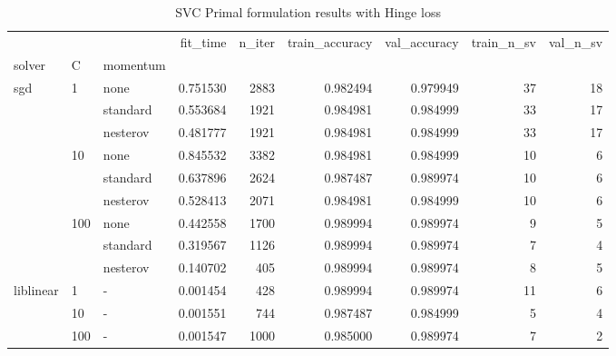 \begin{table}[H]
\centering
\caption{SVC Primal formulation results with Hinge loss}
\label{primal_svc_hinge_cv_results}
\begin{tabular}{lllrrrrrr}
\toprule
          &     &   &  fit\_time &  n\_iter &  train\_accuracy &  val\_accuracy &  train\_n\_sv &  val\_n\_sv \\
solver & C & momentum &           &         &                 &               &             &           \\
\midrule
sgd & 1   & none &  0.751530 &    2883 &        0.982494 &      0.979949 &          37 &        18 \\
          &     & standard &  0.553684 &    1921 &        0.984981 &      0.984999 &          33 &        17 \\
          &     & nesterov &  0.481777 &    1921 &        0.984981 &      0.984999 &          33 &        17 \\
          & 10  & none &  0.845532 &    3382 &        0.984981 &      0.984999 &          10 &         6 \\
          &     & standard &  0.637896 &    2624 &        0.987487 &      0.989974 &          10 &         6 \\
          &     & nesterov &  0.528413 &    2071 &        0.984981 &      0.984999 &          10 &         6 \\
          & 100 & none &  0.442558 &    1700 &        0.989994 &      0.989974 &           9 &         5 \\
          &     & standard &  0.319567 &    1126 &        0.989994 &      0.989974 &           7 &         4 \\
          &     & nesterov &  0.140702 &     405 &        0.989994 &      0.989974 &           8 &         5 \\
liblinear & 1   & - &  0.001454 &     428 &        0.989994 &      0.989974 &          11 &         6 \\
          & 10  & - &  0.001551 &     744 &        0.987487 &      0.984999 &           5 &         4 \\
          & 100 & - &  0.001547 &    1000 &        0.985000 &      0.989974 &           7 &         2 \\
\bottomrule
\end{tabular}
\end{table}
